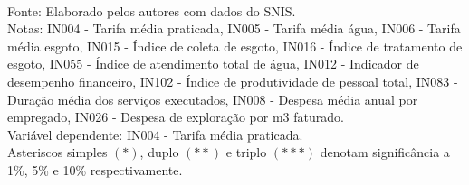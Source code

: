 
\begin{table}[H] \centering 
\begin{minipage}{1\textwidth}
  \caption{Coeficientes angulares das regressões estimadas para cada índice} 
  \label{tab:reg} 
  \small
\footnotesize \\
	Fonte: Elaborado pelos autores com dados do SNIS. \\
	Notas: IN004 - Tarifa média praticada,
	IN005 - Tarifa média água,
	IN006 - Tarifa média esgoto,		
	IN015 - Índice de coleta de esgoto,
	IN016 - Índice de tratamento de esgoto,
	IN055 - Índice de atendimento total de água,	
	IN012 - Indicador de desempenho financeiro,
	IN102 - Índice de produtividade de pessoal total,
	IN083 - Duração média dos serviços executados,	
	IN008 - Despesa média anual por empregado,
	IN026 - Despesa de exploração por m3 faturado. \\
	Variável dependente: IN004 - Tarifa média praticada. \\
	Asteriscos simples $(*)$, duplo $(**)$ e triplo $(***)$ denotam significância a 1\%, 5\% e 10\% respectivamente. 
\end{minipage}
\end{table} 



